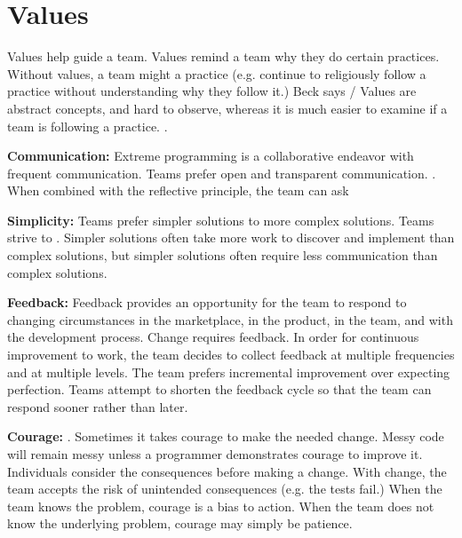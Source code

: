 \section{Values}
Values help guide a team. Values remind a team why they do certain practices. Without values, a team might  a practice (e.g. continue to religiously follow a practice without understanding why they follow it.) Beck says  \cite{BeckExtremeProgramming2004}/ Values are abstract concepts, and hard to observe, whereas it is much easier to examine if a team is following a practice.  \cite{BeckExtremeProgramming2004}.

\textbf{Communication:} Extreme programming is a collaborative endeavor with frequent communication. Teams prefer open and transparent communication. 
 \cite{BeckExtremeProgramming2004}. When combined with the reflective principle, the team can ask  \cite{BeckExtremeProgramming2004}

\textbf{Simplicity:} Teams prefer simpler solutions to more complex solutions. Teams strive to  \cite{BeckExtremeProgramming2004}. Simpler solutions often take more work to discover and implement than complex solutions, but simpler solutions often require less communication than complex solutions.





\textbf{Feedback:} Feedback provides an opportunity for the team to respond to changing circumstances in the marketplace, in the product, in the team, and with the development process. Change requires feedback. In order for continuous improvement to work, the team decides to collect feedback at multiple frequencies and at multiple levels. The team prefers incremental improvement over expecting perfection. Teams attempt to shorten the feedback cycle so that the team can respond sooner rather than later.

\textbf{Courage:}    \cite{BeckExtremeProgramming2004}. Sometimes it takes courage to make the needed change. Messy code will remain messy unless a programmer demonstrates courage to improve it. Individuals consider the consequences before making a change. With change, the team accepts the risk of unintended consequences (e.g. the tests fail.) When the team knows the problem, courage is a bias to action. When the team does not know the underlying problem, courage may simply be patience. 

